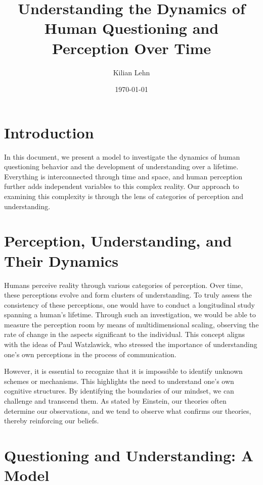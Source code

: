 \documentclass{article}
\begin{document}
\title{Understanding the Dynamics of Human Questioning and Perception Over Time}
\author{Kilian Lehn}
\date{\today}
\maketitle

\section{Introduction}

In this document, we present a model to investigate the dynamics of human questioning behavior and the development of understanding over a lifetime. Everything is interconnected through time and space, and human perception further adds independent variables to this complex reality. Our approach to examining this complexity is through the lens of categories of perception and understanding.

\section{Perception, Understanding, and Their Dynamics}

Humans perceive reality through various categories of perception. Over time, these perceptions evolve and form clusters of understanding. To truly assess the consistency of these perceptions, one would have to conduct a longitudinal study spanning a human's lifetime. Through such an investigation, we would be able to measure the perception room by means of multidimensional scaling, observing the rate of change in the aspects significant to the individual. This concept aligns with the ideas of Paul Watzlawick, who stressed the importance of understanding one's own perceptions in the process of communication.

However, it is essential to recognize that it is impossible to identify unknown schemes or mechanisms. This highlights the need to understand one's own cognitive structures. By identifying the boundaries of our mindset, we can challenge and transcend them. As stated by Einstein, our theories often determine our observations, and we tend to observe what confirms our theories, thereby reinforcing our beliefs.

\section{Questioning and Understanding: A Model}
\end{document}
